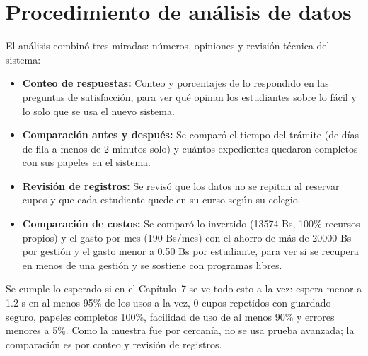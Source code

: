 \section{Procedimiento de análisis de datos}
\label{sec:analisis_datos}

El análisis combinó tres miradas: números, opiniones y revisión técnica del sistema:

\begin{itemize}
    \item \textbf{Conteo de respuestas:} Conteo y porcentajes de lo respondido en las preguntas de satisfacción, para ver qué opinan los estudiantes sobre lo fácil y lo solo que se usa el nuevo sistema.
    \item \textbf{Comparación antes y después:} Se comparó el tiempo del trámite (de días de fila a menos de 2 minutos solo) y cuántos expedientes quedaron completos con sus papeles en el sistema.
    \item \textbf{Revisión de registros:} Se revisó que los datos no se repitan al reservar cupos y que cada estudiante quede en su curso según su colegio.
    \item \textbf{Comparación de costos:} Se comparó lo invertido (13574 Bs, 100\% recursos propios) y el gasto por mes (190 Bs/mes) con el ahorro de más de 20000 Bs por gestión y el gasto menor a 0.50 Bs por estudiante, para ver si se recupera en menos de una gestión y se sostiene con programas libres.
\end{itemize}

Se cumple lo esperado si en el Capítulo~7 se ve todo esto a la vez: espera menor a 1.2 s en al menos 95\% de los usos a la vez, 0 cupos repetidos con guardado seguro, papeles completos 100\%, facilidad de uso de al menos 90\% y errores menores a 5\%. Como la muestra fue por cercanía, no se usa prueba avanzada; la comparación es por conteo y revisión de registros.
